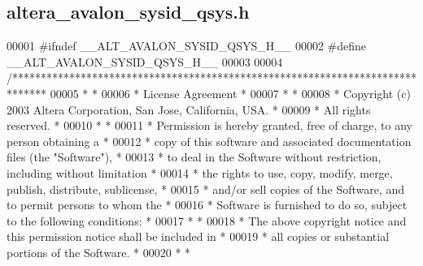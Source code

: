 \subsection{altera\+\_\+avalon\+\_\+sysid\+\_\+qsys.\+h}
\label{altera__avalon__sysid__qsys_8h_source}

\begin{DoxyCode}
00001 \textcolor{preprocessor}{#ifndef \_\_ALT\_AVALON\_SYSID\_QSYS\_H\_\_}
00002 \textcolor{preprocessor}{#define \_\_ALT\_AVALON\_SYSID\_QSYS\_H\_\_}
00003 
00004 \textcolor{comment}{/******************************************************************************}
00005 \textcolor{comment}{*                                                                             *}
00006 \textcolor{comment}{* License Agreement                                                           *}
00007 \textcolor{comment}{*                                                                             *}
00008 \textcolor{comment}{* Copyright (c) 2003 Altera Corporation, San Jose, California, USA.           *}
00009 \textcolor{comment}{* All rights reserved.                                                        *}
00010 \textcolor{comment}{*                                                                             *}
00011 \textcolor{comment}{* Permission is hereby granted, free of charge, to any person obtaining a     *}
00012 \textcolor{comment}{* copy of this software and associated documentation files (the "Software"),  *}
00013 \textcolor{comment}{* to deal in the Software without restriction, including without limitation   *}
00014 \textcolor{comment}{* the rights to use, copy, modify, merge, publish, distribute, sublicense,    *}
00015 \textcolor{comment}{* and/or sell copies of the Software, and to permit persons to whom the       *}
00016 \textcolor{comment}{* Software is furnished to do so, subject to the following conditions:        *}
00017 \textcolor{comment}{*                                                                             *}
00018 \textcolor{comment}{* The above copyright notice and this permission notice shall be included in  *}
00019 \textcolor{comment}{* all copies or substantial portions of the Software.                         *}
00020 \textcolor{comment}{*                                                                             *}

\end{DoxyCode}
